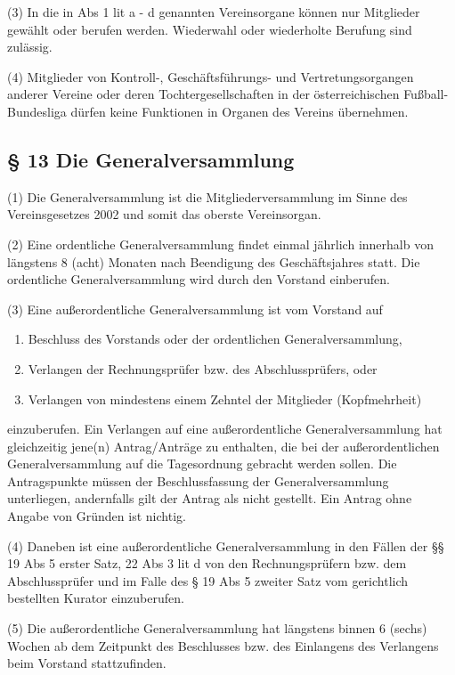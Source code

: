 \documentclass[11pt,a4paper]{article}
\begin{document}
(3)
In die in Abs 1 lit a - d genannten Vereinsorgane können nur Mitglieder gewählt oder berufen werden.
Wiederwahl oder wiederholte Berufung sind zulässig.

(4)
Mitglieder von Kontroll-, Geschäftsführungs- und Vertretungsorgangen anderer Vereine oder deren Tochtergesellschaften in der österreichischen Fußball- Bundesliga dürfen keine Funktionen in Organen des Vereins übernehmen.

\subsection{§ 13
Die Generalversammlung}

(1)
Die Generalversammlung ist die Mitgliederversammlung im Sinne des Vereinsgesetzes 2002 und somit das oberste Vereinsorgan.

(2)
Eine ordentliche Generalversammlung findet einmal jährlich innerhalb von längstens 8 (acht) Monaten nach Beendigung des Geschäftsjahres statt.
Die ordentliche Generalversammlung wird durch den Vorstand einberufen.

(3)
Eine außerordentliche Generalversammlung ist vom Vorstand auf

\begin{enumerate}[label=\alph*)]
\item
Beschluss des Vorstands oder der ordentlichen Generalversammlung,
\item
Verlangen der Rechnungsprüfer bzw. des Abschlussprüfers, oder
\item
Verlangen von mindestens einem Zehntel der Mitglieder (Kopfmehrheit)
\end{enumerate}

einzuberufen.
Ein Verlangen auf eine außerordentliche Generalversammlung hat gleichzeitig jene(n) Antrag/Anträge zu enthalten, die bei der außerordentlichen Generalversammlung auf die Tagesordnung gebracht werden sollen.
Die Antragspunkte müssen der Beschlussfassung der Generalversammlung unterliegen, andernfalls gilt der Antrag als nicht gestellt.
Ein Antrag ohne Angabe von Gründen ist nichtig.

(4)
Daneben ist eine außerordentliche Generalversammlung in den Fällen der §§ 19 Abs 5 erster Satz, 22 Abs 3 lit d von den Rechnungsprüfern bzw. dem Abschlussprüfer und im Falle des § 19 Abs 5 zweiter Satz vom gerichtlich bestellten Kurator einzuberufen.

(5)
Die außerordentliche Generalversammlung hat längstens binnen 6 (sechs) Wochen ab dem Zeitpunkt des Beschlusses bzw. des Einlangens des Verlangens beim Vorstand stattzufinden.
\end{document}
